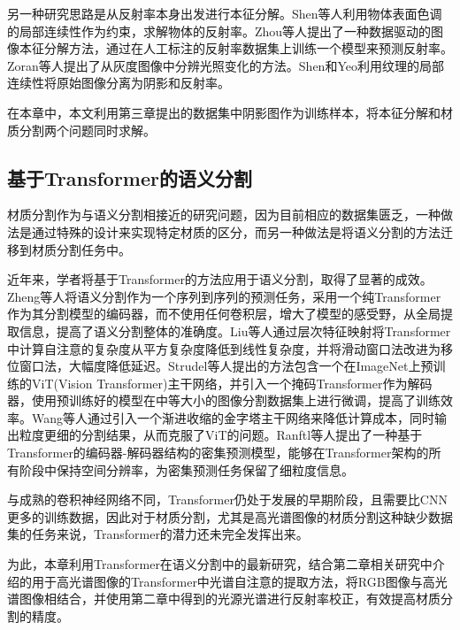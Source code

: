\documentclass[
    type = master, %
    degree = academic,        %
    decl-page,  %
  ]{njuthesis}
\begin{document}
另一种研究思路是从反射率本身出发进行本征分解。Shen等人\cite{IID26}利用物体表面色调的局部连续性作为约束，求解物体的反射率。Zhou等人\cite{IID32}提出了一种数据驱动的图像本征分解方法，通过在人工标注的反射率数据集上训练一个模型来预测反射率。Zoran等人\cite{IID33}提出了从灰度图像中分辨光照变化的方法。Shen和Yeo\cite{IID27}利用纹理的局部连续性将原始图像分离为阴影和反射率。

在本章中，本文利用第三章提出的数据集中阴影图作为训练样本，将本征分解和材质分割两个问题同时求解。

\subsection{基于Transformer的语义分割}
材质分割作为与语义分割相接近的研究问题，因为目前相应的数据集匮乏，一种做法是通过特殊的设计来实现特定材质的区分，而另一种做法是将语义分割的方法迁移到材质分割任务中。

近年来，学者将基于Transformer的方法应用于语义分割，取得了显著的成效。Zheng等人\cite{T5}将语义分割作为一个序列到序列的预测任务，采用一个纯Transformer作为其分割模型的编码器，而不使用任何卷积层，增大了模型的感受野，从全局提取信息，提高了语义分割整体的准确度。Liu等人\cite{T4}通过层次特征映射将Transformer中计算自注意的复杂度从平方复杂度降低到线性复杂度，并将滑动窗口法改进为移位窗口法，大幅度降低延迟。Strudel等人\cite{T11}提出的方法包含一个在ImageNet上预训练的ViT\cite{T2}(Vision Transformer)主干网络，并引入一个掩码Transformer作为解码器，使用预训练好的模型在中等大小的图像分割数据集上进行微调，提高了训练效率。Wang等人\cite{T71,T72}通过引入一个渐进收缩的金字塔主干网络来降低计算成本，同时输出粒度更细的分割结果，从而克服了ViT的问题。Ranftl等人\cite{T74}提出了一种基于Transformer的编码器-解码器结构的密集预测模型，能够在Transformer架构的所有阶段中保持空间分辨率，为密集预测任务保留了细粒度信息。

与成熟的卷积神经网络不同，Transformer仍处于发展的早期阶段，且需要比CNN更多的训练数据，因此对于材质分割，尤其是高光谱图像的材质分割这种缺少数据集的任务来说，Transformer的潜力还未完全发挥出来。

为此，本章利用Transformer在语义分割中的最新研究，结合第二章相关研究中介绍的用于高光谱图像的Transformer中光谱自注意的提取方法，将RGB图像与高光谱图像相结合，并使用第二章中得到的光源光谱进行反射率校正，有效提高材质分割的精度。


\end{document}
